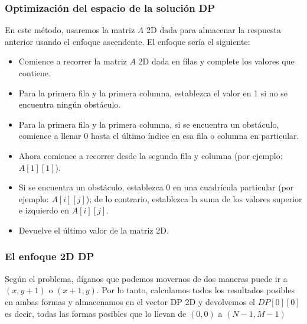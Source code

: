 \subsubsection{Optimización del espacio de la solución DP}

En este método, usaremos la matriz $A$ 2D  dada para almacenar la respuesta anterior usando el enfoque ascendente. El enfoque sería el siguiente:

\begin{itemize}
	\item Comience a recorrer la matriz $A$ 2D  dada en filas y complete los valores que contiene.
	\item Para la primera fila y la primera columna, establezca el valor en 1 si no se encuentra ningún obstáculo.
	\item Para la primera fila y la primera columna, si se encuentra un obstáculo, comience a llenar 0 hasta el último índice en esa fila o columna en particular.
	\item Ahora comience a recorrer desde la segunda fila y columna (por ejemplo: $A[1][1]$).
	\item Si se encuentra un obstáculo, establezca 0 en una cuadrícula particular (por ejemplo: $A[i][j]$); de lo contrario, establezca la suma de los valores superior e izquierdo en $A[i][j]$.
	\item Devuelve el último valor de la matriz 2D.
\end{itemize}

\subsubsection{El enfoque 2D DP}

Según el problema, díganos que podemos movernos de dos maneras puede ir a $(x, y + 1)$ o $(x + 1, y)$. Por lo tanto, calculamos todos los resultados posibles en ambas formas y almacenamos en el vector DP 2D y devolvemos el $DP[0][0]$ es decir, todas las formas posibles que lo llevan de $(0,0)$ a $(N-1,M-1)$